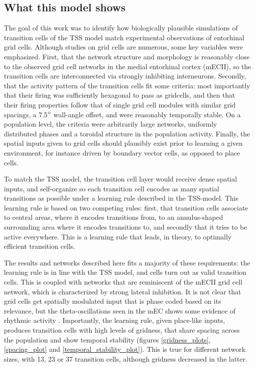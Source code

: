 \documentclass{article}
\begin{document}
    \subsection{What this model shows} \label{TheseResults}
    The goal of this work was to identify how biologically plausible simulations of transition cells of the TSS model match experimental observations of entorhinal grid cells. Although studies on grid cells are numerous, some key variables were emphasized. First, that the network structure and morphology is reasonably close to the observed grid cell networks in the medial entorhinal cortex (mECII), so the transition cells are interconnected via strongly inhibiting interneurons. Secondly, that the activity pattern of the transition cells fit some criteria: most importantly that their firing was sufficiently hexagonal to pass as gridcells, and then that their firing properties follow that of single grid cell modules with similar grid spacings, a 7.5\(\degree\) wall-angle offset, and were reasonably temporally stable. On a population level, the criteria were arbitrarily large networks, uniformly distributed phases and a toroidal structure in the population activity. Finally, the spatial inputs given to grid cells should plausibly exist prior to learning a given environment, for instance driven by boundary vector cells, as opposed to place cells.

    To match the TSS model, the transition cell layer would receive dense spatial inputs, and self-organize so each transition cell encodes as many spatial transitions as possible under a learning rule described in the TSS-model. This learning rule is based on two competing rules: first, that transition cells associate to central areas, where it encodes transitions from, to an annulus-shaped surrounding area where it encodes transitions to, and secondly that it tries to be active everywhere. This is a learning rule that leads, in theory, to optimally efficient transition cells.

    The results and networks described here fits a majority of these requirements: the learning rule is in line with the TSS model, and cells turn out as valid transition cells. This is coupled with networks that are reminiscent of the mECII grid cell network, which is characterized by strong lateral inhibition. It is not clear that grid cells get spatially modulated input that is phase coded based on its relevance, but the theta-oscillations seen in the mEC shows some evidence of rhythmic activity \parencite{Winson1978}. Importantly, the learning rule, given place-like inputs, produces transition cells with high levels of gridness, that share spacing across the population and show temporal stability (figures \ref{gridness_plots}, \ref{spacing_plot} and \ref{temporal_stability_plot}). This is true for different network sizes, with 13, 23 or 37 transition cells, although gridness decreased in the latter.
    
\end{document}
